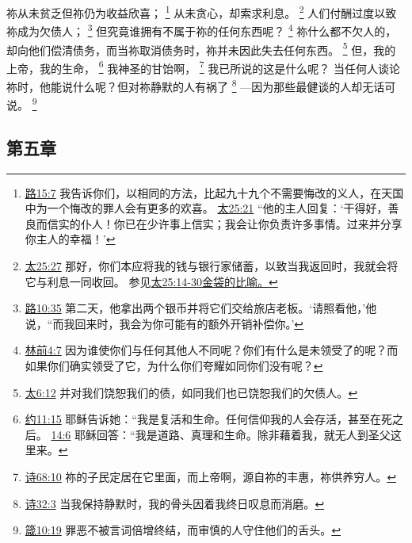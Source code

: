 \documentclass[12pt, a4paper, oneside]{ctexart}
\begin{document}
	祢从未贫乏但祢仍为收益欣喜；
    \footnote {
		\href{https://biblehub.com/luke/15-7.htm}{路15:7} 我告诉你们，以相同的方法，比起九十九个不需要悔改的义人，在天国中为一个悔改的罪人会有更多的欢喜。
        \href{https://biblehub.com/matthew/25-21.htm}{太25:21} “他的主人回复：‘干得好，善良而信实的仆人！你已在少许事上信实；我会让你负责许多事情。过来并分享你主人的幸福！’
	}
    从未贪心，却索求利息。
	\footnote {
		\href{https://biblehub.com/matthew/25-27.htm}{太25:27} 那好，你们本应将我的钱与银行家储蓄，以致当我返回时，我就会将它与利息一同收回。
        参见\href{https://biblehub.com/niv/matthew/25.htm}{太25:14-30金袋的比喻。}
	}
	人们付酬过度以致祢成为欠债人；
    \footnote {
		\href{https://biblehub.com/luke/10-35.htm}{路10:35} 第二天，他拿出两个银币并将它们交给旅店老板。‘请照看他，’他说，“而我回来时，我会为你可能有的额外开销补偿你。’
	}
    但究竟谁拥有不属于祢的任何东西呢？
    \footnote {
		\href{https://biblehub.com/1_corinthians/4-7.htm}{林前4:7} 因为谁使你们与任何其他人不同呢？你们有什么是未领受了的呢？而如果你们确实领受了它，为什么你们夸耀如同你们没有呢？
	}
	祢什么都不欠人的，却向他们偿清债务，而当祢取消债务时，祢并未因此失去任何东西。
    \footnote {
		\href{https://biblehub.com/matthew/6-12.htm}{太6:12} 并对我们饶恕我们的债，如同我们也已饶恕我们的欠债人。
	}
	但，我的上帝，我的生命，
    \footnote {
		\href{https://biblehub.com/john/11-25.htm}{约11:15} 耶稣告诉她：“我是复活和生命。任何信仰我的人会存活，甚至在死之后。
        \href{https://biblehub.com/john/14-6.htm}{14:6} 耶稣回答：“我是道路、真理和生命。除非藉着我，就无人到圣父这里来。
	}
    我神圣的甘饴啊，
    \footnote {
		\href{https://biblehub.com/psalms/68-10.htm}{诗68:10} 祢的子民定居在它里面，而上帝啊，源自祢的丰惠，祢供养穷人。
	}
    我已所说的这是什么呢？
    当任何人谈论祢时，他能说什么呢？但对祢静默的人有祸了
    \footnote {
		\href{https://biblehub.com/psalms/32-3.htm}{诗32:3} 当我保持静默时，我的骨头因着我终日叹息而消磨。
	}
    ---因为那些最健谈的人却无话可说。
    \footnote {
		\href{https://biblehub.com/proverbs/10-19.htm}{箴10:19} 罪恶不被言词倍增终结，而审慎的人守住他们的舌头。
	}

\subsection{第五章}
\end{document}
